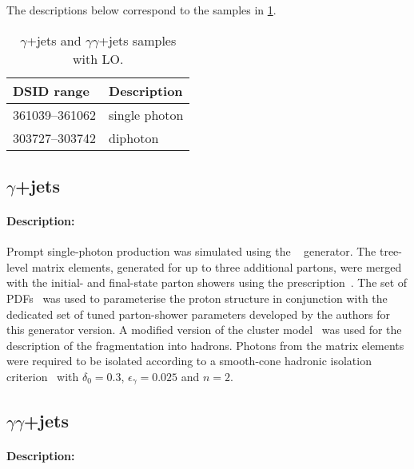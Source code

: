 The descriptions below correspond to the samples in \cref{tab:gammajets-sherpa-lo}.

\begin{table}[!htbp]
  \caption{\(\gamma\)+jets and  \(\gamma\gamma\)+jets samples with \SHERPA LO\@.}%
  \label{tab:gammajets-sherpa-lo}
  \centering
  \begin{tabular}{l l}
    \toprule
    DSID range & Description \\
    \midrule
    361039--361062 & single photon \\
    303727--303742 & diphoton \\
    \bottomrule
  \end{tabular}
\end{table}


\subsection[y+jets]{\(\gamma\)+jets}

\paragraph{Description:}

Prompt single-photon production was simulated using the \SHERPA[2.1]~\cite{Bothmann:2019yzt}
generator. The tree-level matrix elements, generated for up to three
additional partons, were merged with the initial- and final-state parton showers using the
\MEPSatLO prescription~\cite{Hoeche:2009rj}. The \CT[10nlo] set of PDFs~\cite{Lai:2010vv} was
used to parameterise the proton structure in conjunction with the dedicated set of tuned
parton-shower parameters developed by the \SHERPA authors for this generator version. A
modified version of the cluster model~\cite{Winter:2003tt} was used
for the description of the fragmentation into hadrons. Photons from the matrix elements were
required to be isolated according to a smooth-cone hadronic isolation criterion~\cite{Frixione:1998jh}
with \(\delta_0=0.3\), \(\epsilon_{\gamma}=0.025\) and \(n=2\).


\subsection[yy+jets]{ \(\gamma\gamma\)+jets}

\paragraph{Description:}

